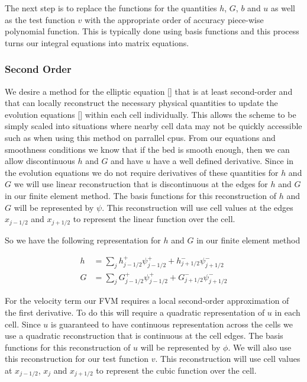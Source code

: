 The next step is to replace the functions for the quantities $h$, $G$, $b$ and $u$ as well as the test function $v$ with the appropriate order of accuracy piece-wise polynomial function. This is typically done using basis functions and this process turns our integral equations into matrix equations.

\subsubsection{Second Order}
We desire a method for the elliptic equation [] that is at least second-order and that can locally reconstruct the necessary physical quantities to update the evolution equations [] within each cell individually. This allows the scheme to be simply scaled into situations where nearby cell data may not be quickly accessible such as when using this method on parrallel cpus. From our equations and smoothness conditions we know that if the bed is smooth enough, then we can allow discontinuous $h$ and $G$ and have $u$ have a well defined derivative. Since in the evolution equations we do not require derivatives of these quantities for $h$ and $G$ we will use linear reconstruction that is discontinuous at the edges for $h$ and $G$ in our finite element method. The basis functions for this reconstruction of $h$ and $G$ will be represented by $\psi$. This reconstruction will use cell values at the edges $x_{j-1/2}$ and $x_{j + 1/2}$ to represent the linear function over the cell.

So we have the following representation for $h$ and $G$ in our finite element method

\begin{align*}
h &= \sum_j h^+_{j-1/2}\psi^+_{j-1/2}  + h^-_{j+1/2}\psi^-_{j+1/2} \\
G &= \sum_j G^+_{j-1/2}\psi^+_{j-1/2}  + G^-_{j+1/2}\psi^-_{j+1/2}
\end{align*}


For the velocity term our FVM requires a local second-order approximation of the first derivative. To do this will require a quadratic representation of $u$ in each cell. Since $u$ is guaranteed to have continuous representation across the cells we use a quadratic reconstruction that is continuous at the cell edges. The basis functions for this reconstruction of $u$ will be represented by $\phi$. We will also use this reconstruction for our test function $v$.  This reconstruction will use cell values at $x_{j-1/2}$, $x_{j}$ and $x_{j + 1/2}$ to represent the cubic function over the cell. 

